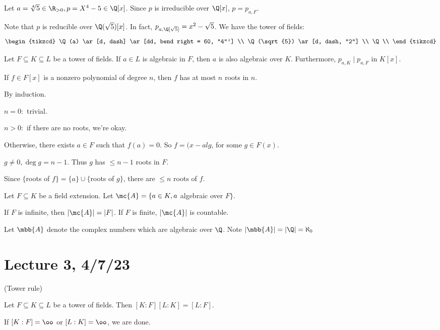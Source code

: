 \documentclass[x11names,reqno,14pt]{extarticle}
\begin{document}
\exm

Let $a = \sqrt[4]{5} \in \R_{>0}, p = X^4 - 5 \in \Q[x]$. Since $p$ is irreducible over $\Q[x]$, $p = p_{a, F}$.

Note that $p$ is reducible over $\Q(\sqrt{5})[x]$. In fact, $p_{a, \Q[\sqrt{5}]} = x^2 - \sqrt{5}$. We have the tower of fields:
\[
\begin{tikzcd}
\Q(a) \ar[d, dash] \ar[dd, bend right = 60, "4"'] \\
\Q(\sqrt{5}) \ar[d, dash, "2"] \\
\Q \\
\end{tikzcd}
\]

Let $F \subseteq K \subseteq L$ be a tower of fields. If $a \in L$ is algebraic in $F$, then $a$ is also algebraic over $K$. Furthermore, $p_{a, K} \mid p_{a, F}$ in $K[x]$. 

\prop

If $f \in F[x]$ is a nonzero polynomial of degree $n$, then $f$ has at most $n$ roots in $n$. 

\proof

By induction.

$n = 0:$ trivial. 

$n > 0:$ if there are no roots, we're okay. 

Otherwise, there exists $a \in F$ such that $f(a) = 0$. So $f = (x-alg$, for some $g \in F(x)$. 

$g \neq0, \deg g = n - 1$. Thus $g$ has $\leq n -1 $ roots in $F$. 

Since $\{$roots of $f\} = \{a\} \cup \{$roots of $g\}$, there are $\leq n$ roots of $f$. 

Let $F \subseteq K$ be a field extension. Let $\mc{A} = \{a\in K, a$ algebraic over $F\}$. 

If $F$ is infinite, then $|\mc{A}| = |F|$. If $F$ is finite, $|\mc{A}|$ is countable. 

Let $\mbb{A}$ denote the complex numbers which are algebraic over $\Q$. Note $|\mbb{A}| = |\Q| = \aleph_0$

\section*{Lecture 3, 4/7/23}

\thm (Tower rule)

Let $F \subseteq K \subseteq L$ be a tower of fields. Then $[K:F][L:K] = [L:F]$. 

\proof

If $[K:F]=\oo$ or $[L:K]=\oo$, we are done. 
\end{document}
